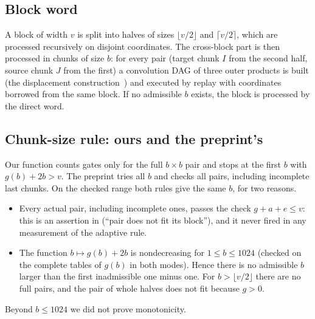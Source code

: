 \documentclass[11pt]{article}
\theoremstyle{plain}
\begin{document}
\subsection{Block word}\label{sec:block}
A block of width $v$ is split into halves of sizes $\lfloor v/2\rfloor$ and $\lceil v/2\rceil$, which are processed recursively on disjoint coordinates. The cross-block part is then processed in chunks of size $b$: for every pair (target chunk $I$ from the second half, source chunk $J$ from the first) a convolution DAG of three outer products is built (the displacement construction~\citep{kailath1979}) and executed by replay with coordinates borrowed from the same block. If no admissible $b$ exists, the block is processed by the direct word.

\subsection{Chunk-size rule: ours and the preprint's}\label{sec:chunk}
Our function  counts gates only for the full $b\times b$ pair and stops at the first $b$ with $g(b)+2b>v$. The preprint tries all $b$ and checks all pairs, including incomplete last chunks. On the checked range both rules give the same $b$, for two reasons.
\begin{itemize}
\item Every actual pair, including incomplete ones, passes the check $g+a+e\le v$: this is an assertion in  (``pair does not fit its block''), and it never fired in any measurement of the adaptive rule.
\item The function $b\mapsto g(b)+2b$ is nondecreasing for $1\le b\le1024$ (checked on the complete tables of $g(b)$ in both modes). Hence there is no admissible $b$ larger than the first inadmissible one minus one. For $b>\lfloor v/2\rfloor$ there are no full pairs, and the pair of whole halves does not fit because $g>0$.
\end{itemize}
Beyond $b\le1024$ we did not prove monotonicity.
\end{document}
